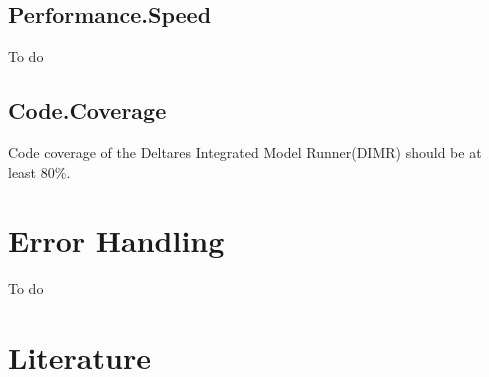 \documentclass[signature]{deltares_manual}
\newcommand{\dimr}{\textrm{DIMR}\xspace}
\newcommand{\dimrfull}{\textrm{Deltares Integrated Model Runner}\xspace}
\newcommand{\ProgramName}{\dimrfull (\dimr)\xspace}
\begin{document}
\section{Performance.Speed}
\label{sec:PerformanceSpeed}
To do

\section{Code.Coverage}
\label{sec:CodeCoverage}
Code coverage of the \ProgramName should be at least 80\%.

\chapter{Error Handling}
\label{sec:ErrorHandling}
To do

\chapter{Literature}  \label{chapterLiterature}



\pagestyle{empty}
\mbox{}

\end{document}
